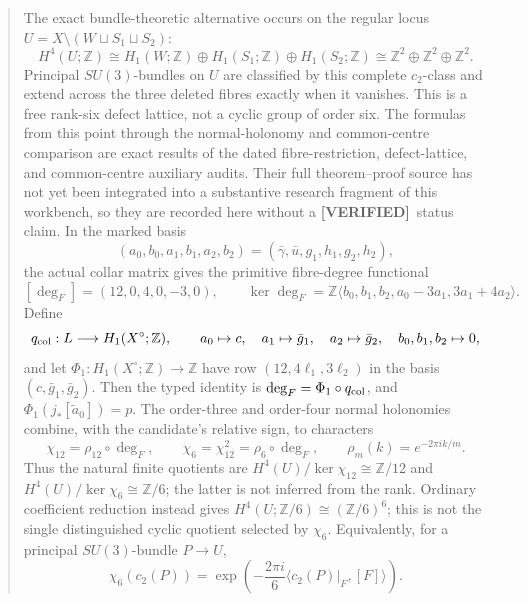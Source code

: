 \documentclass[11pt,letterpaper]{article}
\newcommand{\Status}[2]{\textcolor{#1}{\textbf{[#2]}}}
\newcommand{\Verified}{\Status{Verified}{VERIFIED}}
\theoremstyle{definition}
\theoremstyle{remark}
\begin{document}
\begin{abstract}
 The exact bundle-theoretic alternative occurs on
 the regular locus
 \(U=X\setminus(W\sqcup S_1\sqcup S_2)\):
 \[
  H^4(U;\mathbb Z)
  \cong H_1(W;\mathbb Z)\oplus H_1(S_1;\mathbb Z)
       \oplus H_1(S_2;\mathbb Z)
  \cong\mathbb Z^2\oplus\mathbb Z^2\oplus\mathbb Z^2.
 \]
 Principal \(SU(3)\)-bundles on \(U\) are classified by this complete
 \(c_2\)-class and extend across the three deleted fibres exactly when it
 vanishes.  This is a free rank-six defect lattice, not a cyclic group of
 order six.  The formulas from this point through the normal-holonomy and
 common-centre comparison are exact results of the dated fibre-restriction,
 defect-lattice, and common-centre auxiliary audits.  Their full theorem--proof
 source has not yet been integrated into a substantive research fragment of
 this workbench, so they are recorded here without a \Verified\ status claim.
 In the marked basis
 \[
  (a_0,b_0,a_1,b_1,a_2,b_2)
  =(\bar\gamma,\bar u,g_1,h_1,g_2,h_2),
 \]
 the actual collar matrix gives the primitive fibre-degree functional
 \[
  [\deg_F]=(12,0,4,0,-3,0),\qquad
  \ker\deg_F=\mathbb Z\langle
  b_0,b_1,b_2,a_0-3a_1,3a_1+4a_2\rangle.
 \]
 Define
 \[
  q_{\rm col}:L\longrightarrow H_1(X^\circ;\mathbb Z),\qquad
  a_0\mapsto c,\quad a_1\mapsto\bar g_1,\quad a_2\mapsto\bar g_2,
  \quad b_0,b_1,b_2\mapsto0,
 \]
 and let
 \(\Phi_1:H_1(X^\circ;\mathbb Z)\to\mathbb Z\) have row
 \((12,4\ell_1,3\ell_2)\) in the basis \((c,\bar g_1,\bar g_2)\).
 Then the typed identity is
 \(\deg_F=\Phi_1\circ q_{\rm col}\), and
 \(\Phi_1(j_*[\widetilde a_0])=p\).  The order-three and order-four normal
 holonomies combine, with the candidate's relative sign, to characters
 \[
  \chi_{12}=\rho_{12}\circ\deg_F,\qquad
  \chi_6=\chi_{12}^2=\rho_6\circ\deg_F,\qquad
  \rho_m(k)=e^{-2\pi ik/m}.
 \]
 Thus the natural finite quotients are
 \(H^4(U)/\ker\chi_{12}\cong\mathbb Z/12\) and
 \(H^4(U)/\ker\chi_6\cong\mathbb Z/6\); the latter is not inferred from
 the rank.  Ordinary coefficient reduction instead gives
 \(H^4(U;\mathbb Z/6)\cong(\mathbb Z/6)^6\); this is not the single
 distinguished cyclic quotient selected by \(\chi_6\).  Equivalently, for a
 principal \(SU(3)\)-bundle \(P\to U\),
 \[
  \chi_6(c_2(P))
  =\exp\!\left(-\frac{2\pi i}{6}
  \langle c_2(P)|_F,[F]\rangle\right).
 \]


\end{abstract}
\end{document}
